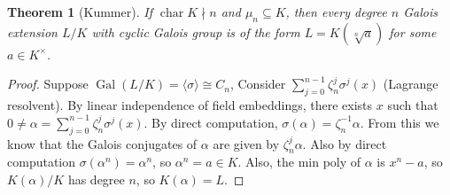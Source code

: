\documentclass{article}
\theoremstyle{definition}
\theoremstyle{remark}
\theoremstyle{plain}
\newtheorem{thm}[defn]{Theorem}
\newcommand{\Gal}{\operatorname{Gal}}
\begin{document}
\begin{thm}[Kummer]
    If $\operatorname{char}K\nmid n$ and $\mu_n\subseteq K$, then every degree $n$ Galois extension $L/K$ with cyclic Galois group is of the form $L=K(\sqrt[n]a)$ for some $a\in K^\times$.
\end{thm}
\begin{proof}
    Suppose $\Gal(L/K)=\langle\sigma\rangle\cong C_n$, Consider $\sum_{j=0}^{n-1}\zeta_n^j\sigma^j(x)$ (Lagrange resolvent). By linear independence of field embeddings, there exists $x$ such that $0\neq \alpha=\sum_{j=0}^{n-1}\zeta_n^j\sigma^j(x)$. By direct computation, $\sigma(\alpha)=\zeta_n^{-1}\alpha$. From this we know that the Galois conjugates of $\alpha$ are given by $\zeta_n^j\alpha$. Also by direct computation $\sigma(\alpha^n)=\alpha^n$, so $\alpha^n=a\in K$. Also, the min poly of $\alpha$ is $x^n-a$, so $K(\alpha)/K$ has degree $n$, so $K(\alpha)=L$.
\end{proof}
\end{document}
